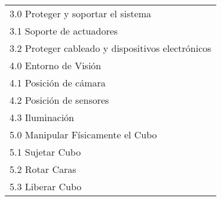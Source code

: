 \begin{table}[H]
\begin{tabular}{l}
3.0 \; Proteger y soportar el sistema \\
\hspace{0.5cm} 3.1 \; Soporte de actuadores \\
\hspace{0.5cm} 3.2 \; Proteger cableado y dispositivos electrónicos \\\hline
4.0 \; Entorno de Visión \\
\hspace{0.5cm} 4.1 \; Posición de cámara \\
\hspace{0.5cm} 4.2 \; Posición de sensores \\
\hspace{0.5cm} 4.3 \; Iluminación \\\hline
5.0 \; Manipular Físicamente el Cubo \\
\hspace{0.5cm} 5.1 \; Sujetar Cubo \\
\hspace{0.5cm} 5.2 \; Rotar Caras \\
\hspace{0.5cm} 5.3 \; Liberar Cubo \\\hline
\end{tabular}%
\end{table}
\renewcommand{\arraystretch}{1.0} %